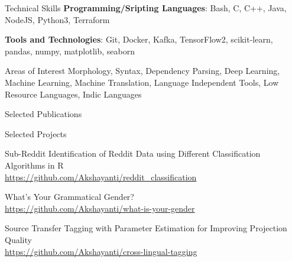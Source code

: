 \documentclass{resume}
\begin{document}

\begin{rSection}{Technical Skills}
    {\textbf{Programming/Sripting Languages}: Bash, C, C++, Java, NodeJS, Python3, Terraform}
    
    {\textbf{Tools and Technologies}: Git, Docker, Kafka, TensorFlow2, scikit-learn, pandas, numpy, matplotlib, seaborn}
    
    \begin{rSubsection}{Areas of Interest}{}{}{}
        Morphology, Syntax, Dependency Parsing, Deep Learning, Machine Learning, Machine Translation, Language Independent Tools, Low Resource Languages, Indic Languages
    \end{rSubsection}
\end{rSection}


\begin{rSection}{Selected Publications}

    {}
    
    {}
    
    {}

    {}

    {}

\end{rSection}



\begin{rSection}{Selected Projects}

    {Sub-Reddit Identification of Reddit Data using Different Classification Algorithms in R}\\
        \url{https://github.com/Akshayanti/reddit_classification}

    {What's Your Grammatical Gender?}\\
        \url{https://github.com/Akshayanti/what-is-your-gender}

    {Source Transfer Tagging with Parameter Estimation for Improving Projection Quality}\\
        \url{https://github.com/Akshayanti/cross-lingual-tagging}

\end{rSection}
\end{document}
